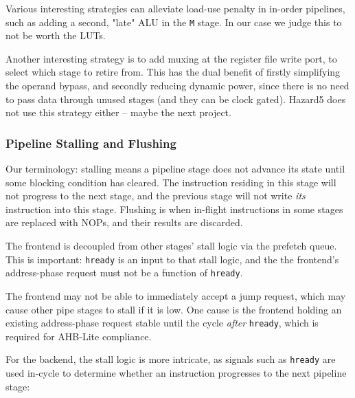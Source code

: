 Various interesting strategies can alleviate load-use penalty in in-order pipelines, such as adding a second, "late" ALU in the {\tt M} stage. In our case we judge this to not be worth the LUTs.

Another interesting strategy is to add muxing at the register file write port, to select which stage to retire from. This has the dual benefit of firstly simplifying the operand bypass, and secondly reducing dynamic power, since there is no need to pass data through unused stages (and they can be clock gated). Hazard5 does not use this strategy either -- maybe the next project.

\subsubsection{Pipeline Stalling and Flushing}
\label{section:stalling_flushing}

Our terminology: stalling means a pipeline stage does not advance its state until some blocking condition has cleared. The instruction residing in this stage will not progress to the next stage, and the previous stage will not write {\it its} instruction into this stage. Flushing is when in-flight instructions in some stages are replaced with NOPs, and their results are discarded.

The frontend is decoupled from other stages' stall logic via the prefetch queue. This is important: {\tt hready} is an input to that stall logic, and the the frontend's address-phase request must not be a function of {\tt hready}.

The frontend may not be able to immediately accept a jump request, which may cause other pipe stages to stall if it is low. One cause is the frontend holding an existing address-phase request stable until the cycle {\it after} {\tt hready}, which is required for AHB-Lite compliance.

For the backend, the stall logic is more intricate, as signals such as {\tt hready} are used in-cycle to determine whether an instruction progresses to the next pipeline stage:

